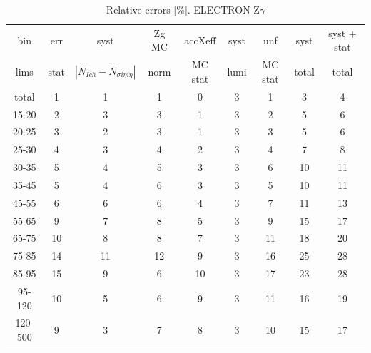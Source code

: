 \begin{table}[h]
  \scriptsize
  \begin{center}
  \caption{Relative errors [\%]. ELECTRON Z$\gamma$}
  \begin{tabular}{|c|c|c|c|c|c|c|c|c|}
    bin  & err & syst & Zg MC & accXeff & syst & unf & syst & syst + stat\\
    lims  & stat & $|N_{Ich}-N_{\sigma{i\eta i\eta}}|$ & norm & MC stat & lumi & MC stat & total & total\\ \hline
    total  & 1 & 1 & 1 & 0 & 3 & 1 & 3 & 4 \\ \hline
    15-20 & 2 & 3 & 3 & 1 & 3 & 2 & 5 & 6 \\ \hline
    20-25 & 3 & 2 & 3 & 1 & 3 & 3 & 5 & 6 \\ \hline
    25-30 & 4 & 3 & 4 & 2 & 3 & 4 & 7 & 8 \\ \hline
    30-35 & 5 & 4 & 5 & 3 & 3 & 6 & 10 & 11 \\ \hline
    35-45 & 5 & 4 & 6 & 3 & 3 & 5 & 10 & 11 \\ \hline
    45-55 & 6 & 6 & 6 & 4 & 3 & 7 & 11 & 13 \\ \hline
    55-65 & 9 & 7 & 8 & 5 & 3 & 9 & 15 & 17 \\ \hline
    65-75 & 10 & 8 & 8 & 7 & 3 & 11 & 18 & 20 \\ \hline
    75-85 & 14 & 11 & 12 & 9 & 3 & 16 & 25 & 28 \\ \hline
    85-95 & 15 & 9 & 6 & 10 & 3 & 17 & 23 & 28 \\ \hline
    95-120 & 10 & 5 & 6 & 9 & 3 & 11 & 16 & 19 \\ \hline
    120-500 & 9 & 3 & 7 & 8 & 3 & 10 & 15 & 17 \\ \hline
  \end{tabular}
  \label{tab:systInPercent_ELECTRON_ZGamma}
  \end{center}
\end{table}

